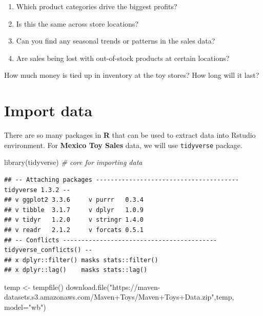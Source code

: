 \documentclass[
]{book}
\newenvironment{Shaded}{\begin{snugshade}}{\end{snugshade}}
\newcommand{\AttributeTok}[1]{\textcolor[rgb]{0.77,0.63,0.00}{#1}}
\newcommand{\CommentTok}[1]{\textcolor[rgb]{0.56,0.35,0.01}{\textit{#1}}}
\newcommand{\FunctionTok}[1]{\textcolor[rgb]{0.00,0.00,0.00}{#1}}
\newcommand{\NormalTok}[1]{#1}
\newcommand{\OtherTok}[1]{\textcolor[rgb]{0.56,0.35,0.01}{#1}}
\newcommand{\StringTok}[1]{\textcolor[rgb]{0.31,0.60,0.02}{#1}}
\begin{document}
\begin{enumerate}
\def\labelenumi{\arabic{enumi}.}
\item
  Which product categories drive the biggest profits?
\item
  Is this the same across store locations?
\item
  Can you find any seasonal trends or patterns in the sales data?
\item
  Are sales being lost with out-of-stock products at certain locations?
\end{enumerate}

How much money is tied up in inventory at the toy stores?
How long will it last?

\hypertarget{import-data}{%
\section{Import data}\label{import-data}}

There are so many packages in \textbf{R} that can be used to extract data into Rstudio environment.
For \textbf{Mexico Toy Sales} data, we will use \texttt{tidyverse} package.

\begin{Shaded}
\begin{Highlighting}[]
\FunctionTok{library}\NormalTok{(tidyverse) }\CommentTok{\# core for importing data}
\end{Highlighting}
\end{Shaded}

\begin{verbatim}
## -- Attaching packages --------------------------------------- tidyverse 1.3.2 --
## v ggplot2 3.3.6     v purrr   0.3.4
## v tibble  3.1.7     v dplyr   1.0.9
## v tidyr   1.2.0     v stringr 1.4.0
## v readr   2.1.2     v forcats 0.5.1
## -- Conflicts ------------------------------------------ tidyverse_conflicts() --
## x dplyr::filter() masks stats::filter()
## x dplyr::lag()    masks stats::lag()
\end{verbatim}

\begin{Shaded}
\begin{Highlighting}[]
\NormalTok{temp }\OtherTok{\textless{}{-}} \FunctionTok{tempfile}\NormalTok{()}
\FunctionTok{download.file}\NormalTok{(}\StringTok{"https://maven{-}datasets.s3.amazonaws.com/Maven+Toys/Maven+Toys+Data.zip"}\NormalTok{,temp, }\AttributeTok{model=}\StringTok{"wb"}\NormalTok{)}
\end{Highlighting}
\end{Shaded}
\end{document}
